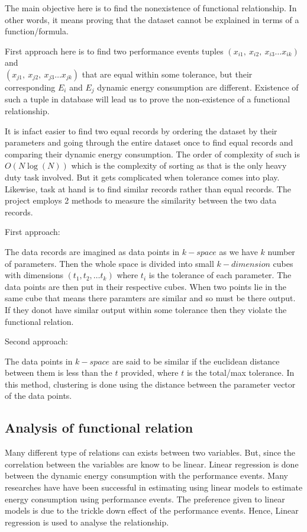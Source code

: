 The main objective here is to find the nonexistence of functional relationship. In other words, it means proving that the dataset cannot be explained in terms of a function/formula.

First approach here is to find two performance events tuples \((x_{i1},\ x_{i2},\ x_{i3} \ldots x_{ik})\) and \\ \((x_{j1},\ x_{j2},\ x_{j3} \ldots x_{jk})\) that are equal within some tolerance, but their corresponding \(E_i\) and \(E_j\) dynamic energy consumption are different. Existence of such a tuple in database will lead us to prove the non-existence of a functional relationship.

It is infact easier to find two equal records by ordering the dataset by their parameters and going through the entire dataset once to find equal records and comparing their dynamic energy consumption. The order of complexity of such is \(O(N \log(N))\) which is the complexity of sorting as that is the only heavy duty task involved. But it gets complicated when tolerance comes into play. Likewise, task at hand is to find similar records rather than equal records. The project employs 2 methods to measure the similarity between the two data records.

First approach:

The data records are imagined as data points in \(k-space\) as we have \(k\) number of parameters. Then the whole space is divided into small \(k-dimension\) cubes with dimensions \((t_1, t_2, \ldots t_k)\) where \(t_i\) is the tolerance of each parameter. The data points are then put in their respective cubes. When two points lie in the same cube that means there paramters are similar and so must be there output. If they donot have similar output within some tolerance then they violate the functional relation.

Second approach:

The data points in \(k-space\) are said to be similar if the euclidean distance between them is less than the \(t\) provided, where \(t\) is the total/max tolerance. In this method, clustering is done using the distance between the parameter vector of the data points.

\subsection{Analysis of functional relation}

Many different type of relations can exists between two variables. But, since the correlation between the variables are know to be linear. Linear regression is done between the dynamic energy consumption with the performance events. Many researches have have been successful in estimating using linear models to estimate energy consumption using performance events.\cite{o2017survey} The preference given to linear models is due to the trickle down effect of the performance events.\cite{bircher2007complete} Hence, Linear regression is used to analyse the relationship.

